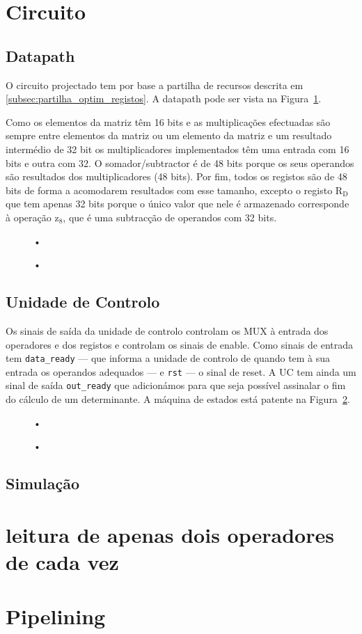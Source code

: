 \documentclass[a4paper]{article}
\begin{document}
\section{Circuito}
\subsection{Datapath}

O circuito projectado tem por base a partilha de recursos descrita em \ref{subsec:partilha_optim_registos}. A datapath pode ser vista na Figura~\ref{fig:datapath}.

Como os elementos da matriz têm 16 bits e as multiplicações efectuadas são sempre entre elementos da matriz ou um elemento da matriz e um resultado intermédio de 32 bit os multiplicadores implementados têm uma entrada com 16 bits e outra com 32. O somador/subtractor é de 48 bits porque os seus operandos são resultados dos multiplicadores (48 bits). Por fim, todos os registos são de 48 bits de forma a acomodarem resultados com esse tamanho, excepto o registo $\mathrm{R_D}$ que tem apenas 32 bits porque o único valor que nele é armazenado corresponde à operação $\mathrm{z_8}$, que é uma subtracção de operandos com 32 bits.

\begin{figure}[]
\centering
•
\caption{•}
\label{fig:datapath}
\end{figure}

\subsection{Unidade de Controlo}

Os sinais de saída da unidade de controlo controlam os MUX à entrada dos operadores e dos registos e controlam os sinais de enable. Como sinais de entrada tem \texttt{data\_ready} --- que informa a unidade de controlo de quando tem à sua entrada os operandos adequados --- e \texttt{rst} --- o sinal de reset. A UC tem ainda um sinal de saída \texttt{out\_ready} que adicionámos para que seja possível assinalar o fim do cálculo de um determinante. A máquina de estados está patente na Figura~\ref{fig:statemachine}.

\begin{figure}
\centering
•
\caption{•}
\label{fig:statemachine}
\end{figure}

\subsection{Simulação}

\section{leitura de apenas dois operadores de cada vez}

\section{Pipelining}
\end{document}
